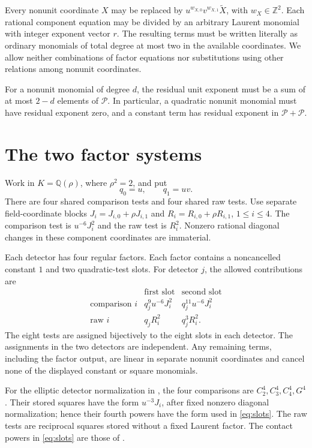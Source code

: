 \documentclass[11pt,a4paper]{article}
\newcommand{\Z}{\mathbb Z}
\newcommand{\Q}{\mathbb Q}
\newcommand{\Pset}{\mathcal P}
\begin{document}
Every nonunit coordinate $X$ may be replaced by
$u^{w_{X,0}}v^{w_{X,1}}\widetilde X$, with $w_X\in\Z^2$.
Each rational component equation may be divided by an arbitrary
Laurent monomial with integer exponent vector $r$.
The resulting terms must be written literally as ordinary monomials
of total degree at most two in the available coordinates. We allow
neither combinations of factor equations nor substitutions using
other relations among nonunit coordinates.

For a nonunit monomial of degree $d$, the residual unit exponent
must be a sum of at most $2-d$ elements of $\Pset$. In particular,
a quadratic nonunit monomial must have residual exponent zero,
and a constant term has residual exponent in $\Pset+\Pset$.

\section{The two factor systems}

Work in $K=\Q(\rho)$, where $\rho^2=2$, and put
\[
                  q_0=u,\qquad q_1=uv.
\]
There are four shared comparison tests and four shared raw tests.
Use separate field-coordinate blocks
$J_i=J_{i,0}+\rho J_{i,1}$ and
$R_i=R_{i,0}+\rho R_{i,1}$, $1\le i\le4$.
The comparison test is $u^{-6}J_i^2$ and the raw test is $R_i^2$.
Nonzero rational diagonal changes in these component coordinates
are immaterial.

Each detector has four regular factors. Each factor contains a
noncancelled constant $1$ and two quadratic-test slots. For detector
$j$, the allowed contributions are
\begin{equation}\label{eq:slots}
\begin{array}{c|cc}
 &\text{first slot}&\text{second slot}\\\hline
\text{comparison }i&q_j^9u^{-6}J_i^2&q_j^{11}u^{-6}J_i^2\\
\text{raw }i&q_jR_i^2&q_j^3R_i^2.
\end{array}
\end{equation}
The eight tests are assigned bijectively to the eight slots in each
detector. The assignments in the two detectors are independent.
Any remaining terms, including the factor output, are linear in
separate nonunit coordinates and cancel none of the displayed
constant or square monomials.

For the elliptic detector normalization in \cite{Physical}, the
four comparisons are $C_2^4,C_3^4,C_4^4,G^4$. Their stored
squares have the form $u^{-3}J_i$, after fixed nonzero diagonal
normalization; hence their fourth powers have the form used in
\eqref{eq:slots}. The raw tests are reciprocal squares stored
without a fixed Laurent factor. The contact powers in
\eqref{eq:slots} are those of \cite{Factors}.
\end{document}
